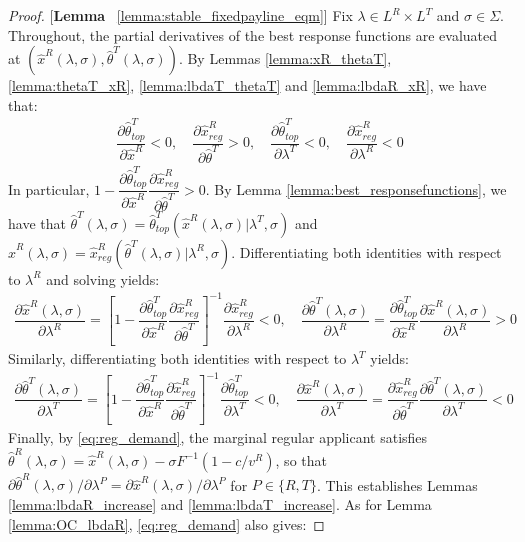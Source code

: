 \begin{proof}{[\textbf{Lemma} ~\ref{lemma:stable_fixedpayline_eqm}]}
Fix $\lambda\in L^R\times L^T$ and $\sigma\in \Sigma$. Throughout, the partial derivatives of the best response functions are evaluated at $(\hat{x}^R(\lambda,\sigma),\hat{\theta}^T(\lambda,\sigma))$. By Lemmas \ref{lemma:xR_thetaT}, \ref{lemma:thetaT_xR}, \ref{lemma:lbdaT_thetaT} and \ref{lemma:lbdaR_xR}, we have that:
\begin{align*}
  \dfrac{\partial \hat{\theta}^T_{top}}{\partial \hat{x}^R} < 0, \quad \dfrac{\partial \hat{x}^R_{reg}}{\partial \hat{\theta}^T} > 0, \quad \dfrac{\partial \hat{\theta}^T_{top}}{\partial \lambda^T} < 0, \quad \dfrac{\partial \hat{x}^R_{reg}}{\partial \lambda^R} < 0
\end{align*}
In particular, $1 - \dfrac{\partial \hat{\theta}^T_{top}}{\partial \hat{x}^R}\dfrac{\partial \hat{x}^R_{reg}}{\partial \hat{\theta}^T} > 0$. By Lemma \ref{lemma:best_responsefunctions}, we have that $\hat{\theta}^T(\lambda,\sigma) = \hat{\theta}^T_{top}(\hat{x}^R(\lambda,\sigma)|\lambda^T,\sigma)$ and $\hat{x}^R(\lambda,\sigma) = \hat{x}^R_{reg}(\hat{\theta}^T(\lambda,\sigma)|\lambda^R,\sigma)$. Differentiating both identities with respect to $\lambda^R$ and solving yields:
\begin{align*}
  \dfrac{\partial \hat{x}^R(\lambda,\sigma)}{\partial \lambda^R} = \left[1 - \dfrac{\partial \hat{\theta}^T_{top}}{\partial \hat{x}^R}\dfrac{\partial \hat{x}^R_{reg}}{\partial \hat{\theta}^T}\right]^{-1}\dfrac{\partial \hat{x}^R_{reg}}{\partial \lambda^R} < 0, \quad \dfrac{\partial \hat{\theta}^T(\lambda,\sigma)}{\partial \lambda^R} = \dfrac{\partial \hat{\theta}^T_{top}}{\partial \hat{x}^R}\dfrac{\partial \hat{x}^R(\lambda,\sigma)}{\partial \lambda^R} > 0
\end{align*}
Similarly, differentiating both identities with respect to $\lambda^T$ yields:
\begin{align*}
  \dfrac{\partial \hat{\theta}^T(\lambda,\sigma)}{\partial \lambda^T} = \left[1 - \dfrac{\partial \hat{\theta}^T_{top}}{\partial \hat{x}^R}\dfrac{\partial \hat{x}^R_{reg}}{\partial \hat{\theta}^T}\right]^{-1}\dfrac{\partial \hat{\theta}^T_{top}}{\partial \lambda^T} < 0, \quad \dfrac{\partial \hat{x}^R(\lambda,\sigma)}{\partial \lambda^T} = \dfrac{\partial \hat{x}^R_{reg}}{\partial \hat{\theta}^T}\dfrac{\partial \hat{\theta}^T(\lambda,\sigma)}{\partial \lambda^T} < 0
\end{align*}
Finally, by \eqref{eq:reg_demand}, the marginal regular applicant satisfies $\hat{\theta}^R(\lambda,\sigma) = \hat{x}^R(\lambda,\sigma) - \sigma F^{-1}(1-c/v^R)$, so that $\partial \hat{\theta}^R(\lambda,\sigma)/\partial \lambda^P = \partial \hat{x}^R(\lambda,\sigma)/\partial \lambda^P$ for $P\in\{R,T\}$. This establishes Lemmas \ref{lemma:lbdaR_increase} and \ref{lemma:lbdaT_increase}. As for Lemma \ref{lemma:OC_lbdaR}, \eqref{eq:reg_demand} also gives:

\end{proof}
